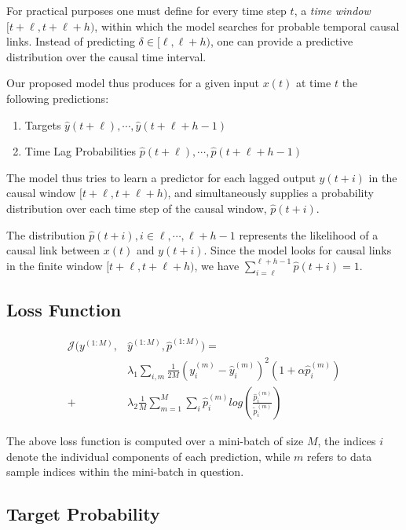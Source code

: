 \documentclass[envcountsect,runningheads]{llncs}
\theoremstyle{etoile}
\begin{document}
For practical purposes one must define for every time step $t$, a \emph{time window} 
$[t+\ell, t+\ell+h)$, within which the model searches for probable temporal causal links. 
Instead of predicting $\delta \in [\ell, \ell+h)$, one can provide a predictive distribution 
over the causal time interval.

Our proposed model thus produces for a given input $x(t)$ at time $t$ the following predictions:

\begin{enumerate}
\item Targets $\hat{y}(t+\ell), \cdots, \hat{y}(t+\ell+h-1)$
\item Time Lag Probabilities $\hat{p}(t+\ell), \cdots, \hat{p}(t+\ell+h-1)$
\end{enumerate}

The model thus tries to learn a predictor for each lagged output $y(t+i)$ in the causal window 
$[t+\ell, t+\ell+h)$, and simultaneously supplies a probability distribution over each time step 
of the causal window, $\hat{p}(t+i)$.

The distribution $\hat{p}(t+i), i \in {\ell, \cdots, \ell+h-1}$ represents the 
likelihood of a causal link between $x(t)$ and $y(t+i)$. Since the model looks
for causal links in the finite window $[t+\ell, t+\ell+h)$, we have 
$\sum^{\ell+h-1}_{i = \ell}{\hat{p}(t + i)} = 1$.


\subsection{Loss Function}

\begin{equation}\label{eq:loss}
\begin{aligned}
\mathcal{J}(y^{(1:M)}, &\hat{y}^{(1:M)}, \hat{p}^{(1:M)}) =\\ 
&\lambda_1 \sum_{i,m}{\frac{1}{2M} (y^{(m)}_{i} - \hat{y}^{(m)}_{i})^2 (1 + \alpha \hat{p}^{(m)}_i)} \\ 
+ &\lambda_2 \frac{1}{M} \sum_{m = 1}^{M}{\sum_{i}{\hat{p}^{(m)}_{i}log \left (\frac{\hat{p}^{(m)}_i}{\tilde{p}^{(m)}_i} \right)}}
\end{aligned}
\end{equation}
      

The above loss function is computed over a mini-batch of size $M$, the indices $i$ denote the
individual components of each prediction, while $m$ refers to data sample indices within the
mini-batch in question.


\subsection{Target Probability}\label{sec:targetprob}
\end{document}
